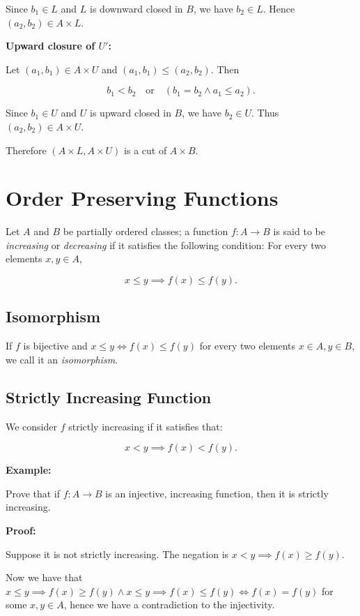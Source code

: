 Since \(b_1 \in L\) and \(L\) is downward closed in \(B\), we have \(b_2 \in L\).
Hence \((a_2,b_2) \in A \times L\).

\textbf{Upward closure of \(U'\):}

Let \((a_1,b_1) \in A \times U\) and \((a_1,b_1) \le (a_2,b_2)\).
Then

\[
	b_1 < b_2 \quad \text{or} \quad (b_1 = b_2 \land a_1 \le a_2).
\]

Since \(b_1 \in U\) and \(U\) is upward closed in \(B\), we have \(b_2 \in U\).
Thus \((a_2,b_2) \in A \times U\).

Therefore \((A \times L, A \times U)\) is a cut of \(A \times B\).

\QED

\section{Order Preserving Functions}

Let \(A\) and \(B\) be partially ordered classes; a function \(f: A \to B\) is said to be \emph{increasing} or
\emph{decreasing} if it satisfies the following condition: For every two elements \(x, y \in A\),

\[
	x \le y \implies f(x) \le f(y).
\]

\subsection{Isomorphism}

If \(f\) is bijective and \(x \le y \iff f(x) \le f(y)\) for every two elements \(x \in A, y \in B\), we call it an \emph{isomorphism}.

\subsection{Strictly Increasing Function}

We consider \(f\) strictly increasing if it satisfies that:

\[
	x < y \implies f(x) < f(y).
\]

\textbf{Example:}

Prove that if \(f : A \to B\) is an injective, increasing function, then it is strictly increasing.

\textbf{Proof:}

Suppose it is not strictly increasing. The negation is \(x < y \implies f(x) \ge f(y)\).

Now we have that \(x \le y \implies f(x) \ge f(y) \land x \le y \implies f(x) \le f(y) \iff f(x) = f(y)\) for some \(x, y \in A\), hence we have a contradiction
to the injectivity.

